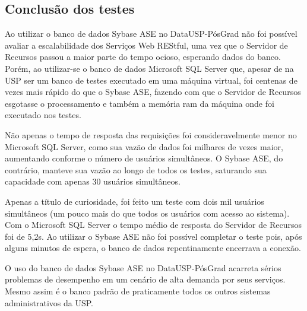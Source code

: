 \subsection{Conclusão dos testes}

Ao utilizar o banco de dados Sybase ASE no DataUSP-PósGrad não foi possível avaliar a escalabilidade dos Serviços Web REStful, uma vez que o Servidor de Recursos passou a maior parte do tempo ocioso, esperando dados do banco. Porém, ao utilizar-se o banco de dados Microsoft SQL Server que, apesar de na USP ser um banco de testes executado em uma máquina virtual, foi centenas de vezes mais rápido do que o Sybase ASE, fazendo com que o Servidor de Recursos esgotasse o processamento e também a memória ram da máquina onde foi executado nos testes.
\par
Não apenas o tempo de resposta das requisições foi consideravelmente menor no Microsoft SQL Server, como sua vazão de dados foi milhares de vezes maior, aumentando conforme o número de usuários simultâneos. O Sybase ASE, do contrário, manteve sua vazão ao longo de todos os testes, saturando sua capacidade com apenas 30 usuários simultâneos. 
\par
Apenas a título de curiosidade, foi feito um teste com dois mil usuários simultâneos (um pouco mais do que todos os usuários com acesso ao sistema). Com o Microsoft SQL Server o tempo médio de resposta do Servidor de Recursos foi de 5,2s. Ao utilizar o Sybase ASE não foi possível completar o teste pois, após alguns minutos de espera, o banco de dados repentinamente encerrava a conexão.
\par 
O uso do banco de dados Sybase ASE no DataUSP-PósGrad acarreta sérios problemas de desempenho em um cenário de alta demanda por seus serviços. Mesmo assim é o banco padrão de praticamente todos os outros sistemas administrativos da USP.
